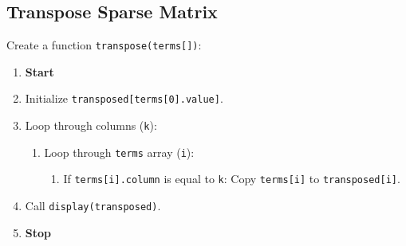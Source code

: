 \subsection{Transpose Sparse Matrix}
  Create a function \texttt{transpose(terms[])}:
    \begin{enumerate}
    \item \textbf{Start}
      \item Initialize \texttt{transposed[terms[0].value]}.
      \item Loop through columns (\texttt{k}):
        \begin{enumerate}[label=2.\arabic*:]
          \item Loop through \texttt{terms} array (\texttt{i}):
            \begin{enumerate}[label=2.1.\arabic*:]
              \item If \texttt{terms[i].column} is equal to \texttt{k}:
                  Copy \texttt{terms[i]} to \texttt{transposed[i]}.
            \end{enumerate}
        \end{enumerate}
      \item Call \texttt{display(transposed)}.
      \item \textbf{Stop}
    \end{enumerate}  

